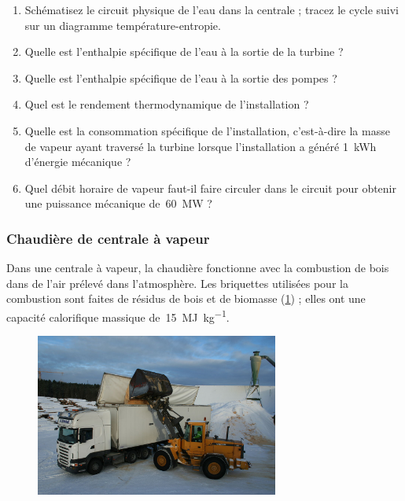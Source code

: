 	\begin{enumerate}
		\item Schématisez le circuit physique de l’eau dans la centrale ; tracez le cycle suivi sur un diagramme température-entropie.
		\item Quelle est l’enthalpie spécifique de l’eau à la sortie de la turbine ?
		\item Quelle est l’enthalpie spécifique de l’eau à la sortie des pompes ?
		\item	Quel est le rendement thermodynamique de l’installation ?
		\item Quelle est la consommation spécifique de l’installation, c’est-à-dire la masse de vapeur ayant traversé la turbine lorsque l’installation a généré \SI{1}{\kWh} d’énergie mécanique ?
		\item Quel débit horaire de vapeur faut-il faire circuler dans le circuit pour obtenir une puissance mécanique de~\SI{60}{\mega\watt} ?
	\end{enumerate}
	

\subsubsection{Chaudière de centrale à vapeur}

	Dans une centrale à vapeur, la chaudière fonctionne avec la combustion de bois dans de l’air prélevé dans l’atmosphère. Les briquettes utilisées pour la combustion sont faites de résidus de bois et de biomasse (\cref{fig_sciure}) ; elles ont une capacité calorifique massique de~\SI{15}{\mega\joule\per\kilogram}.
	
	\begin{figure}
		\begin{center}
			\includegraphics[width=8cm]{images/sciure.jpg}
		\end{center}
		\label{fig_sciure}
	\end{figure}
	
